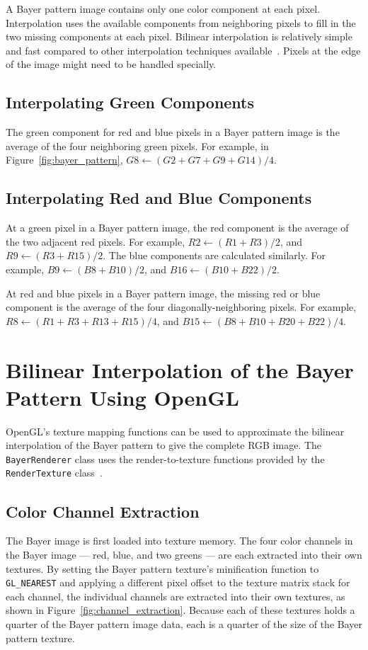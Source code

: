 \documentclass[11pt,letterpaper]{article}
\begin{document}
A Bayer pattern image contains only one color component at each pixel.
Interpolation uses the available components from neighboring pixels to
fill in the two missing components at each pixel.  Bilinear
interpolation is relatively simple and fast compared to other
interpolation techniques available~\cite{tingchen}.  Pixels at the edge
of the image might need to be handled specially.
\subsection{Interpolating Green Components}

The green component for red and blue pixels in a Bayer pattern image
is the average of the four neighboring green pixels.  For example, in
Figure~\ref{fig:bayer_pattern}, \(G8\gets(G2+G7+G9+G14)/4\).
\subsection{Interpolating Red and Blue Components}

At a green pixel in a Bayer pattern image, the red component is the
average of the two adjacent red pixels.  For example,
\(R2\gets(R1+R3)/2\), and \(R9\gets(R3+R15)/2\).  The blue
components are calculated similarly.  For example,
\(B9\gets(B8+B10)/2\), and \(B16\gets(B10+B22)/2\).

At red and blue pixels in a Bayer pattern image, the missing red or
blue component is the average of the four diagonally-neighboring
pixels.  For example, \(R8\gets(R1+R3+R13+R15)/4\), and
\(B15\gets(B8+B10+B20+B22)/4\).
\section{Bilinear Interpolation of the Bayer Pattern Using OpenGL}

OpenGL's texture mapping functions can be used to approximate the
bilinear interpolation of the Bayer pattern to give the complete RGB
image.  The \texttt{BayerRenderer} class uses the render-to-texture
functions provided by the \texttt{RenderTexture}
class~\cite{rendertexture}.
\subsection{Color Channel Extraction}

The Bayer image is first loaded into texture memory.  The four color
channels in the Bayer image --- red, blue, and two greens --- are each
extracted into their own textures.  By setting the Bayer pattern
texture's minification function to \texttt{GL\_NEAREST} and applying a
different pixel offset to the texture matrix stack for each channel,
the individual channels are extracted into their own textures, as
shown in Figure~\ref{fig:channel_extraction}.  Because each of these
textures holds a quarter of the Bayer pattern image data, each is a
quarter of the size of the Bayer pattern texture.
\end{document}
